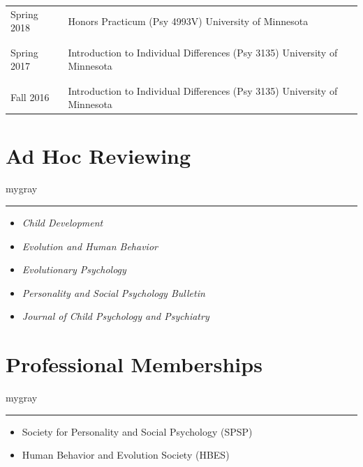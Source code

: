 \documentclass[
]{article}
\providecommand{\tightlist}{%
  \setlength{\itemsep}{0pt}\setlength{\parskip}{0pt}}
\begin{document}
\begin{longtable}{p{2.25cm}p{5.5in}}
 Spring 2018 & Honors Practicum (Psy 4993V) \newline University of Minnesota \\\\& \\
 Spring 2017 & Introduction to Individual Differences (Psy 3135) \newline University of Minnesota \\\\& \\
 Fall 2016 & Introduction to Individual Differences (Psy 3135) \newline University of Minnesota \\
\end{longtable}

\vspace{1ex}

\hypertarget{ad-hoc-reviewing}{%
\section{\texorpdfstring{\textbf{Ad Hoc
Reviewing}}{Ad Hoc Reviewing}}\label{ad-hoc-reviewing}}

\vspace{1ex}
\begin{color}{mygray}\hrule\end{color}
\vspace{1ex}

\begin{itemize}
\tightlist
\item
  \emph{Child Development}
\item
  \emph{Evolution and Human Behavior}
\item
  \emph{Evolutionary Psychology}
\item
  \emph{Personality and Social Psychology Bulletin}
\item
  \emph{Journal of Child Psychology and Psychiatry}
\end{itemize}

\vspace{1ex}

\hypertarget{professional-memberships}{%
\section{\texorpdfstring{\textbf{Professional
Memberships}}{Professional Memberships}}\label{professional-memberships}}

\vspace{1ex}
\begin{color}{mygray}\hrule\end{color}
\vspace{1ex}

\begin{itemize}
\tightlist
\item
  Society for Personality and Social Psychology (SPSP)
\item
  Human Behavior and Evolution Society (HBES)
\end{itemize}
\end{document}
